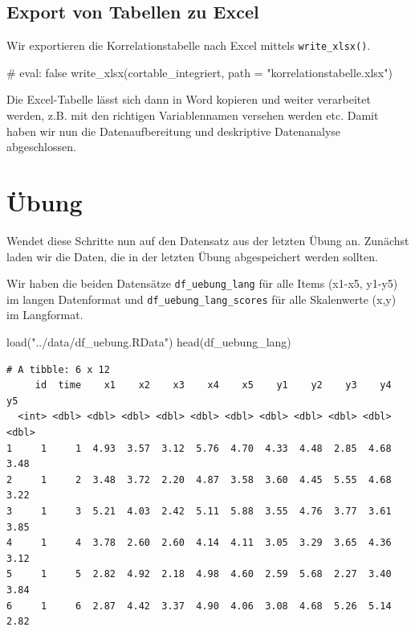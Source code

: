 \documentclass[
  letterpaper,
  DIV=11,
  numbers=noendperiod]{scrreprt}
\newenvironment{Shaded}{\begin{snugshade}}{\end{snugshade}}
\newcommand{\AttributeTok}[1]{\textcolor[rgb]{0.40,0.45,0.13}{#1}}
\newcommand{\CommentTok}[1]{\textcolor[rgb]{0.37,0.37,0.37}{#1}}
\newcommand{\FunctionTok}[1]{\textcolor[rgb]{0.28,0.35,0.67}{#1}}
\newcommand{\NormalTok}[1]{\textcolor[rgb]{0.00,0.23,0.31}{#1}}
\newcommand{\StringTok}[1]{\textcolor[rgb]{0.13,0.47,0.30}{#1}}
\begin{document}
\subsection{Export von Tabellen zu
Excel}\label{export-von-tabellen-zu-excel}

Wir exportieren die Korrelationstabelle nach Excel mittels
\texttt{write\_xlsx()}.

\begin{Shaded}
\begin{Highlighting}[]
\CommentTok{\# eval: false}
\FunctionTok{write\_xlsx}\NormalTok{(cortable\_integriert, }\AttributeTok{path =} \StringTok{"korrelationstabelle.xlsx"}\NormalTok{)}
\end{Highlighting}
\end{Shaded}

Die Excel-Tabelle lässt sich dann in Word kopieren und weiter
verarbeitet werden, z.B. mit den richtigen Variablennamen versehen
werden etc. Damit haben wir nun die Datenaufbereitung und deskriptive
Datenanalyse abgeschlossen.

\section{Übung}\label{uxfcbung}

Wendet diese Schritte nun auf den Datensatz aus der letzten Übung an.
Zunächst laden wir die Daten, die in der letzten Übung abgespeichert
werden sollten.

Wir haben die beiden Datensätze \texttt{df\_uebung\_lang} für alle Items
(x1-x5, y1-y5) im langen Datenformat und
\texttt{df\_uebung\_lang\_scores} für alle Skalenwerte (x,y) im
Langformat.

\begin{Shaded}
\begin{Highlighting}[]
\FunctionTok{load}\NormalTok{(}\StringTok{"../data/df\_uebung.RData"}\NormalTok{)}
\FunctionTok{head}\NormalTok{(df\_uebung\_lang)}
\end{Highlighting}
\end{Shaded}

\begin{verbatim}
# A tibble: 6 x 12
     id  time    x1    x2    x3    x4    x5    y1    y2    y3    y4    y5
  <int> <dbl> <dbl> <dbl> <dbl> <dbl> <dbl> <dbl> <dbl> <dbl> <dbl> <dbl>
1     1     1  4.93  3.57  3.12  5.76  4.70  4.33  4.48  2.85  4.68  3.48
2     1     2  3.48  3.72  2.20  4.87  3.58  3.60  4.45  5.55  4.68  3.22
3     1     3  5.21  4.03  2.42  5.11  5.88  3.55  4.76  3.77  3.61  3.85
4     1     4  3.78  2.60  2.60  4.14  4.11  3.05  3.29  3.65  4.36  3.12
5     1     5  2.82  4.92  2.18  4.98  4.60  2.59  5.68  2.27  3.40  3.84
6     1     6  2.87  4.42  3.37  4.90  4.06  3.08  4.68  5.26  5.14  2.82
\end{verbatim}
\end{document}
